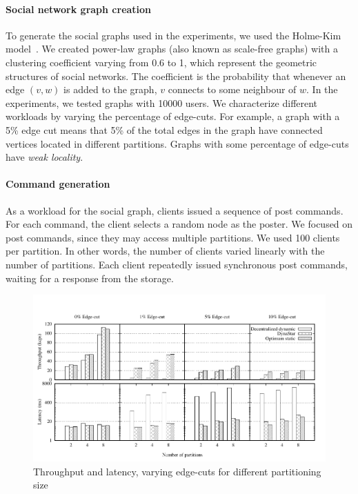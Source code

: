 \paragraph*{Social network graph creation}
%
To generate the social graphs used in the experiments, we used the
Holme-Kim model~\cite{holme-kim}.  We created power-law graphs (also
known as scale-free graphs) with a clustering coefficient varying from
0.6 to 1, which represent the geometric structures of social
networks. The coefficient is the probability that whenever an edge
$(v, w)$ is added to the graph, $v$ connects to some neighbour of $w$.
In the experiments, we tested graphs with 10000 users. We characterize
different workloads by varying the percentage of edge-cuts.  For
example, a graph with a 5\% edge cut means that 5\% of the total edges
in the graph have connected vertices located in different partitions.
Graphs with some percentage of edge-cuts have \emph{weak locality}.

\paragraph*{Command generation}
%
As a workload for the social graph, clients issued a sequence of post
commands.  For each command, the client selects a random node as
the poster.  We focused on post commands, since they may access
multiple partitions.  We used 100 clients per partition. In other
words, the number of clients varied linearly with the number of
partitions.  Each client repeatedly issued synchronous post commands,
waiting for a response from the storage.

\begin{figure}[ht!]
	\includegraphics{figures/experiments/throughput-latency-avg-all}
	\caption{Throughput and latency, varying edge-cuts for different partitioning size}
	\label{fig:varying_edge_cut}
\end{figure}



